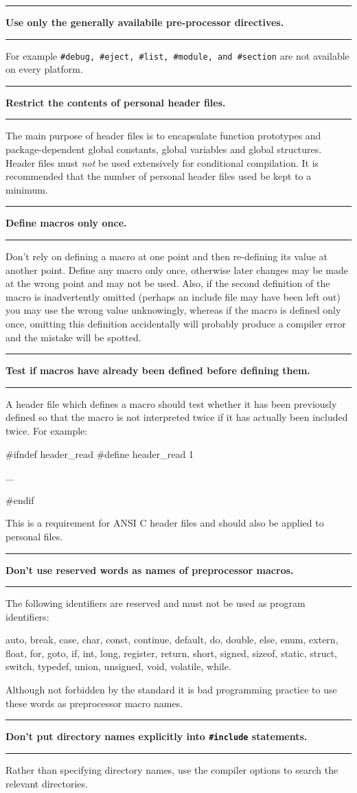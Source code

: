 \documentclass[twoside,11pt,nolof,noabs]{starlink}
\newcounter{sruleno}
\newcommand{\srule}[1]{
    \addtocounter{sruleno}{1}
    \goodbreak
    \rule{\textwidth}{0.3mm}
    \textbf{#1} \scpushright{\textbf{\thesruleno}}
    \rule{\textwidth}{0.1mm}
}
\begin{document}
\newpage
\srule{Use only the generally availabile pre-processor directives.}
For example \verb~#debug, #eject, #list, #module, and #section~
are not available on every platform.

\srule{Restrict the contents of personal header files.}
The main purpose of header files is to encapsulate function prototypes
and package-dependent global constants, global variables and global structures.
Header files must {\sl not\/} be used extensively for conditional
compilation.  It is recommended that the number of personal header files used
be kept to a minimum.

\srule{Define macros only once.}
Don't rely on defining a macro at one point and then re-defining its
value at another point. Define any macro only once, otherwise later changes may
be made at the wrong point and may not be used. Also, if the second
definition of the macro is inadvertently omitted (perhaps an include
file may have been left out) you
may use the wrong value unknowingly,
whereas if the macro is defined
only once, omitting this definition accidentally will probably produce
a compiler error and the mistake will be spotted.


\srule{Test if macros have already been defined before defining them.}
A header file which defines a macro  should test whether it has been
previously defined  so that the macro is
not interpreted twice if it has actually been included twice. For example:
\begin{terminalv}
      #ifndef header_read
      #define header_read 1

        ...

      #endif
\end{terminalv}
This is a requirement for ANSI C header files and should also be applied to
personal files.

\srule{Don't use reserved words as names of preprocessor macros.}
The following identifiers are reserved and must not be used as program
identifiers:
\begin{terminalv}
      auto, break, case, char, const, continue, default, do, double,
      else, enum, extern, float, for, goto, if, int, long, register,
      return, short, signed, sizeof, static, struct, switch, typedef,
      union, unsigned, void, volatile, while.
\end{terminalv}
Although  not forbidden by the standard it is bad programming practice
to use these words as preprocessor macro names.


\srule{Don't put directory names explicitly into \texttt{\#include} statements.}
Rather than specifying directory names, use the
compiler options to search the relevant directories.
\end{document}
